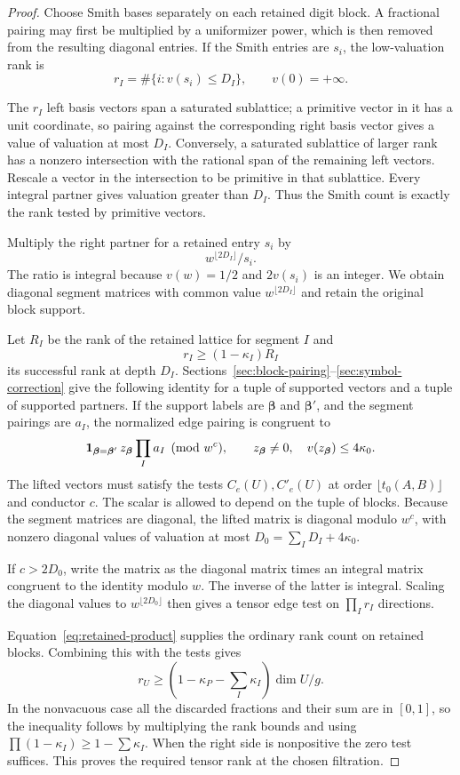 \begin{proof}
Choose Smith bases separately on each retained digit block. A
fractional pairing may first be multiplied by a uniformizer
power, which is then removed from the resulting diagonal entries.
If the Smith entries are \(s_i\), the low-valuation rank is
\[
 r_I=\#\{i:v(s_i)\le D_I\},\qquad v(0)=+\infty.
\]

The \(r_I\) left basis vectors span a saturated sublattice; a
primitive vector in it has a unit coordinate, so pairing against
the corresponding right basis vector gives a value of valuation
at most \(D_I\). Conversely, a saturated sublattice of larger
rank has a nonzero intersection with the rational span of the
remaining left vectors. Rescale a vector in the intersection to
be primitive in that sublattice. Every integral partner gives
valuation greater than \(D_I\). Thus the Smith count is exactly
the rank tested by primitive vectors.

Multiply the right partner for a retained entry \(s_i\) by
\[
 w^{\lfloor2D_I\rfloor}/s_i.
\]
The ratio is integral because
\(v(w)=1/2\) and \(2v(s_i)\) is an integer. We obtain diagonal
segment matrices with common value \(w^{\lfloor2D_I\rfloor}\)
and retain the original block support.

Let \(R_I\) be the rank of the retained lattice for segment \(I\)
and
\[
 r_I\ge(1-\kappa_I)R_I
\]
its successful rank at depth
\(D_I\). Sections~\ref{sec:block-pairing}--\ref{sec:symbol-correction} give the following identity
for a tuple of supported vectors and a tuple of supported
partners. If the support labels are \(\boldsymbol\beta\) and
\(\boldsymbol\beta'\), and the segment pairings are \(a_I\),
the normalized edge pairing is congruent to
\[
  {\bf 1}_{\boldsymbol\beta=\boldsymbol\beta'}\,
                z_{\boldsymbol\beta}\prod_I a_I \pmod{w^c},
   \qquad z_{\boldsymbol\beta}\ne0,\quad
                      v(z_{\boldsymbol\beta})\le4\kappa_0 .
\]
The lifted vectors must satisfy the tests \(C_e(U),C'_e(U)\)
at order \(\lfloor t_0(A,B)\rfloor\) and conductor \(c\).
 The scalar is allowed
to depend on the tuple of blocks. Because the segment
matrices are diagonal, the lifted matrix is diagonal modulo
\(w^c\), with nonzero diagonal values of valuation at most
\(D_0=\sum_I D_I+4\kappa_0\).

If \(c>2D_0\), write the matrix as the diagonal matrix times
an integral matrix congruent to the identity modulo \(w\).
The inverse of the latter is integral. Scaling the
diagonal values to \(w^{\lfloor 2D_0\rfloor}\) then gives a
tensor edge test on \(\prod_I r_I\) directions.

Equation~\eqref{eq:retained-product} supplies the ordinary rank count
on retained blocks.
Combining this with the tests gives
\[
 r_U\ge \left(1-\kappa_P-\sum_I\kappa_I\right)\dim U/g .
\]
In the nonvacuous case all the discarded fractions and their
sum are in \([0,1]\), so the inequality follows by multiplying
the rank bounds and using \(\prod(1-\kappa_I)\ge1-\sum\kappa_I\).
When the right side is nonpositive the zero test suffices.
This proves the required tensor rank at the chosen filtration.

\end{proof}

